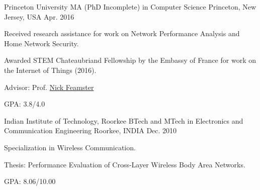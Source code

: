 

\begin{cventries}

\cventry
    {Princeton University} %
    {MA (PhD Incomplete) in Computer Science} %
    {Princeton, New Jersey, USA} %
    {Apr. 2016} %
    {
      \begin{cvitems} %
      	\item {Received research assistance for work on Network Performance Analysis and Home Network Security.}
      	\item {Awarded STEM Chateaubriand Fellowship by the Embassy of France for work on the Internet of Things (2016).}
      	\item {Advisor: Prof. \href{https://www.cs.princeton.edu/~feamster}{Nick Feamster}}
      	\item {GPA: 3.8/4.0}
      \end{cvitems}
    }

\cventry  
    {Indian Institute of Technology, Roorkee} %
    {BTech and MTech in Electronics and Communication Engineering} %
    {Roorkee, INDIA} %
    {Dec. 2010} %
    {
      \begin{cvitems} %
      	\item {Specialization in Wireless Communication.}
      	\item {Thesis: Performance Evaluation of Cross-Layer Wireless Body Area Networks.}
      	\item {GPA: 8.06/10.00}
      \end{cvitems}
    }

\end{cventries}
